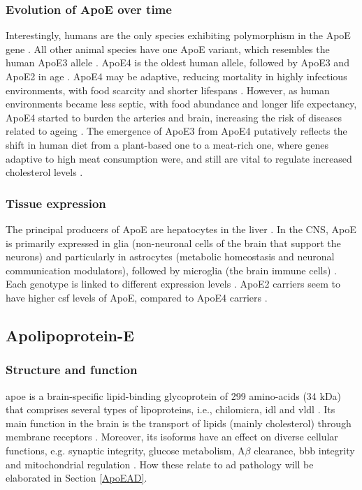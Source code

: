 \documentclass{amsart}
\begin{document}
\subsubsection{Evolution of ApoE over time}
Interestingly, humans are the only species exhibiting polymorphism in the ApoE gene \cite{Yassine2020APOEDisease}. All other animal species have one ApoE variant, which resembles the human ApoE3 allele \cite{Hunsberger2019TheInterventions}. ApoE4 is the oldest human allele, followed by ApoE3 and ApoE2 in age \cite{Yassine2020APOEDisease}. ApoE4 may be adaptive, reducing mortality in highly infectious environments, with food scarcity and shorter lifespans \cite{Trumble2017ApolipoproteinBurden}. However, as human environments became less septic, with food abundance and longer life expectancy, ApoE4 started to burden the arteries and brain, increasing the risk of diseases related to ageing \cite{Yassine2020APOEDisease}. The emergence of ApoE3 from ApoE4 putatively reflects the shift in human diet from a plant-based one to a meat-rich one, where genes adaptive to high meat consumption were, and still are vital to regulate increased cholesterol levels \cite{Finch1999TheIsoforms}. 

\subsubsection{Tissue expression}
The principal producers of ApoE are hepatocytes in the liver \cite{Mahley2016CentralMetabolism}. In the CNS, ApoE is primarily expressed in glia (non-neuronal cells of the brain that support the neurons) and particularly in astrocytes (metabolic homeostasis and neuronal communication modulators), followed by microglia (the brain immune cells) \cite{Lanfranco2021ExpressionInflammation}. Each genotype is linked to different expression levels \cite{Husain2021APOETherapeutics}. ApoE2 carriers seem to have higher \acrfull{csf} levels of ApoE, compared to ApoE4 carriers \cite{Castellano2011HumanClearance, Cruchaga2012CerebrospinalDisease}. 

\subsection{Apolipoprotein-E}\label{ApoEprot}
\subsubsection{Structure and function}
\acrshort{apoe} is a brain-specific lipid-binding glycoprotein of 299 amino-acids (34 kDa) that comprises several types of lipoproteins, i.e., chilomicra, \acrlong{idl} and \acrlong{vldl} \cite{Husain2021APOETherapeutics}. Its main function in the brain is the transport of lipids (mainly cholesterol) through membrane receptors \cite{Yang2023ApolipoproteinDisease}. Moreover, its isoforms have an effect on diverse cellular functions, e.g. synaptic integrity, glucose metabolism, A$\beta$ clearance, \acrlong{bbb} integrity and mitochondrial regulation \cite{Husain2021APOETherapeutics}. How these relate to \acrshort{ad} pathology will be elaborated in Section \ref{ApoEAD}.
\end{document}
